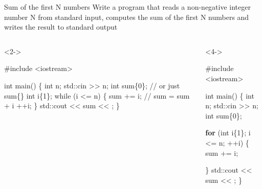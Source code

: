 \begin{frame}[fragile]{Sum of the first N numbers}
  Write a program that reads a non-negative integer number N from standard
  input, computes the sum of the first N numbers and writes the result to
  standard output

  \begin{columns}[T]

    \begin{column}{.5\textwidth}
      \begin{codeblock}<2->{
#include <iostream>

int main()
\{
  int n;
  std::cin >> n;
  int sum\{0\}; // or just sum\{\}
  \alert<3->{int i\{1\};}
  while (\alert<3->{i <= n}) \{
    sum += i;   // sum = sum + i
    \alert<3->{++i};
  \}
  std::cout << sum << \bslashn;
\}}\end{codeblock}

    \end{column}

    \begin{column}{.5\textwidth}
      \begin{codeblock}<4->{
#include <iostream>

int main()
\{
  int n;
  std::cin >> n;
  int sum\{0\};

  \textbf<4>{for} (\alert<4>{int i\{1\}}; \alert<4>{i <= n}; \alert<4>{++i}) \{
    sum += i;

  \}
  std::cout << sum << \bslashn;
\}}\end{codeblock}
    \end{column}

  \end{columns}
\end{frame}

